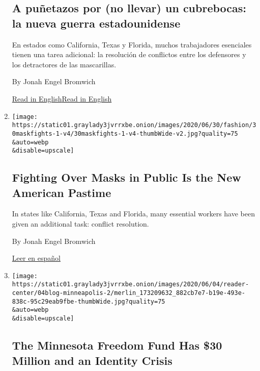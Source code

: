 \begin{enumerate}
{  \subsection{A puñetazos por (no llevar) un cubrebocas: la nueva guerra
  estadounidense}\label{a-puuxf1etazos-por-no-llevar-un-cubrebocas-la-nueva-guerra-estadounidense}}

  En estados como California, Texas y Florida, muchos trabajadores
  esenciales tienen una tarea adicional: la resolución de conflictos
  entre los defensores y los detractores de las mascarillas.

  By Jonah Engel Bromwich

  \href{https://www.nytimes3xbfgragh.onion/2020/06/30/style/mask-america-freedom-coronavirus.html}{Read
  in
  English}\href{https://www.nytimes3xbfgragh.onion/2020/06/30/style/mask-america-freedom-coronavirus.html}{Read
  in English}
\item
  \href{/2020/06/30/style/mask-america-freedom-coronavirus.html}{}

  \texttt{[image: https://static01.graylady3jvrrxbe.onion/images/2020/06/30/fashion/30maskfights-1-v4/30maskfights-1-v4-thumbWide-v2.jpg?quality=75\\\&auto=webp\\\&disable=upscale]}

  \hypertarget{fighting-over-masks-in-public-is-the-new-american-pastime}{%
  \subsection{Fighting Over Masks in Public Is the New American
  Pastime}\label{fighting-over-masks-in-public-is-the-new-american-pastime}}

  In states like California, Texas and Florida, many essential workers
  have been given an additional task: conflict resolution.

  By Jonah Engel Bromwich

  \href{https://www.nytimes3xbfgragh.onion/es/2020/07/02/espanol/cubrebocas-pelea-tiendas-video.html}{Leer
  en español}
\item
  \href{/2020/06/16/style/minnesota-freedom-fund-donations.html}{}

  \texttt{[image: https://static01.graylady3jvrrxbe.onion/images/2020/06/04/reader-center/04blog-minneapolis-2/merlin\_173209632\_882cb7e7-b19e-493e-838c-95c29eab9fbe-thumbWide.jpg?quality=75\\\&auto=webp\\\&disable=upscale]}

  \hypertarget{the-minnesota-freedom-fund-has-30-million-and-an-identity-crisis}{%
  \subsection{The Minnesota Freedom Fund Has \$30 Million and an
  Identity
  Crisis}\label{the-minnesota-freedom-fund-has-30-million-and-an-identity-crisis}}


\end{enumerate}
